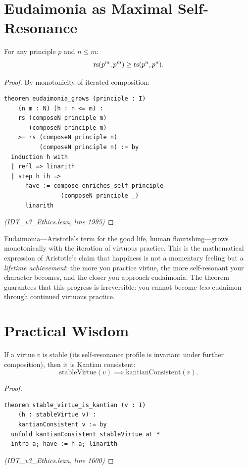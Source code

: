 \section{Eudaimonia as Maximal Self-Resonance}

\begin{theorem}
\label{thm:eudaimonia}
For any principle $p$ and $n \leq m$:
\[
  \mathrm{rs}(p^m, p^m) \geq \mathrm{rs}(p^n, p^n).
\]
\end{theorem}

\begin{proof}
By monotonicity of iterated composition:
\begin{lstlisting}
theorem eudaimonia_grows (principle : I)
    (n m : N) (h : n <= m) :
    rs (composeN principle m)
       (composeN principle m)
    >= rs (composeN principle n)
          (composeN principle n) := by
  induction h with
  | refl => linarith
  | step h ih =>
      have := compose_enriches_self principle
                (composeN principle _)
      linarith
\end{lstlisting}
\textit{(IDT\_v3\_Ethics.lean, line 1995)}
\end{proof}

\begin{interpretation}
Eudaimonia---Aristotle's term for the good life, human flourishing---grows
monotonically with the iteration of virtuous practice. This is the mathematical
expression of Aristotle's claim that happiness is not a momentary feeling but
a \emph{lifetime achievement}: the more you practice virtue, the more
self-resonant your character becomes, and the closer you approach eudaimonia.
The theorem guarantees that this progress is irreversible: you cannot become
\emph{less} eudaimon through continued virtuous practice.
\end{interpretation}

\section{Practical Wisdom}

\begin{theorem}
\label{thm:stable-virtue-kantian}
If a virtue $v$ is stable (its self-resonance profile is invariant under
further composition), then it is Kantian consistent:
\[
  \mathrm{stableVirtue}(v) \implies \mathrm{kantianConsistent}(v).
\]
\end{theorem}

\begin{proof}
\begin{lstlisting}
theorem stable_virtue_is_kantian (v : I)
    (h : stableVirtue v) :
    kantianConsistent v := by
  unfold kantianConsistent stableVirtue at *
  intro a; have := h a; linarith
\end{lstlisting}
\textit{(IDT\_v3\_Ethics.lean, line 1600)}
\end{proof}

